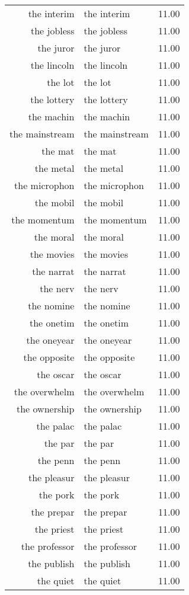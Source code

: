 \begin{table}[ht]
\begin{tabular}{rlr}
  the interim & the interim & 11.00 \\ 
  the jobless & the jobless & 11.00 \\ 
  the juror & the juror & 11.00 \\ 
  the lincoln & the lincoln & 11.00 \\ 
  the lot & the lot & 11.00 \\ 
  the lottery & the lottery & 11.00 \\ 
  the machin & the machin & 11.00 \\ 
  the mainstream & the mainstream & 11.00 \\ 
  the mat & the mat & 11.00 \\ 
  the metal & the metal & 11.00 \\ 
  the microphon & the microphon & 11.00 \\ 
  the mobil & the mobil & 11.00 \\ 
  the momentum & the momentum & 11.00 \\ 
  the moral & the moral & 11.00 \\ 
  the movies & the movies & 11.00 \\ 
  the narrat & the narrat & 11.00 \\ 
  the nerv & the nerv & 11.00 \\ 
  the nomine & the nomine & 11.00 \\ 
  the onetim & the onetim & 11.00 \\ 
  the oneyear & the oneyear & 11.00 \\ 
  the opposite & the opposite & 11.00 \\ 
  the oscar & the oscar & 11.00 \\ 
  the overwhelm & the overwhelm & 11.00 \\ 
  the ownership & the ownership & 11.00 \\ 
  the palac & the palac & 11.00 \\ 
  the par & the par & 11.00 \\ 
  the penn & the penn & 11.00 \\ 
  the pleasur & the pleasur & 11.00 \\ 
  the pork & the pork & 11.00 \\ 
  the prepar & the prepar & 11.00 \\ 
  the priest & the priest & 11.00 \\ 
  the professor & the professor & 11.00 \\ 
  the publish & the publish & 11.00 \\ 
  the quiet & the quiet & 11.00 \\ 

\end{tabular}
\end{table}
